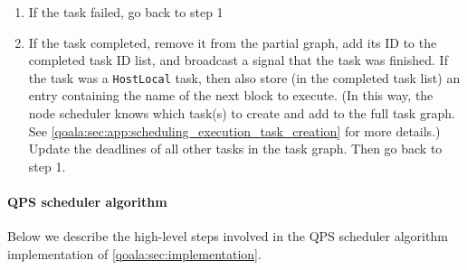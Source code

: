 \begin{enumerate}
    \item If the task failed, go back to step 1
    \item If the task completed, remove it from the partial graph, add its ID to the completed task ID list, and broadcast a signal that the task was finished. If the task was a \texttt{HostLocal} task, then also store (in the completed task list) an entry containing the name of the next block to execute. (In this way, the node scheduler knows which task(s) to create and add to the full task graph. See \cref{qoala:sec:app:scheduling_execution_task_creation} for more details.)
    Update the deadlines of all other tasks in the task graph.
    Then go back to step 1.
\end{enumerate}

\paragraph{QPS scheduler algorithm}
Below we describe the high-level steps involved in the QPS scheduler algorithm implementation of \cref{qoala:sec:implementation}.
